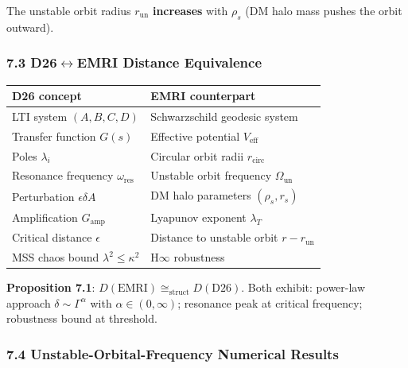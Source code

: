 \documentclass[
]{article}
\newcounter{none} %
\begin{document}
The unstable orbit radius \(r_{\text{un}}\) \textbf{increases} with
\(\rho_s\) (DM halo mass pushes the orbit outward).

\subsubsection{\texorpdfstring{7.3 D26\(\leftrightarrow\)EMRI Distance
Equivalence}{7.3 D26\textbackslash leftrightarrowEMRI Distance Equivalence}}\label{d26leftrightarrowemri-distance-equivalence}

{\def\LTcaptype{none} %
\begin{longtable}[]{@{}
  >{\raggedright\arraybackslash}p{}
  >{\raggedright\arraybackslash}p{}@{}}
\toprule\noalign{}
\begin{minipage}[b]{\linewidth}\raggedright
D26 concept
\end{minipage} & \begin{minipage}[b]{\linewidth}\raggedright
EMRI counterpart
\end{minipage} \\
\midrule\noalign{}
\endhead
\bottomrule\noalign{}
\endlastfoot
LTI system \((A,B,C,D)\) & Schwarzschild geodesic system \\
Transfer function \(G(s)\) & Effective potential \(V_{\text{eff}}\) \\
Poles \(\lambda_i\) & Circular orbit radii \(r_{\text{circ}}\) \\
Resonance frequency \(\omega_{\text{res}}\) & Unstable orbit frequency
\(\Omega_{\text{un}}\) \\
Perturbation \(\epsilon \delta A\) & DM halo parameters
\((\rho_s, r_s)\) \\
Amplification \(G_{\text{amp}}\) & Lyapunov exponent \(\lambda_T\) \\
Critical distance \(\epsilon\) & Distance to unstable orbit
\(r - r_{\text{un}}\) \\
MSS chaos bound \(\lambda^2 \leq \kappa^2\) & H\(\infty\) robustness \\
\end{longtable}
}

\textbf{Proposition 7.1}:
\(D(\text{EMRI}) \cong_{\text{struct}} D(\text{D26})\). Both exhibit:
power-law approach \(\delta \sim \Gamma^\alpha\) with
\(\alpha \in (0, \infty)\); resonance peak at critical frequency;
robustness bound at threshold.

\subsubsection{7.4 Unstable-Orbital-Frequency Numerical
Results}\label{unstable-orbital-frequency-numerical-results}
\end{document}
